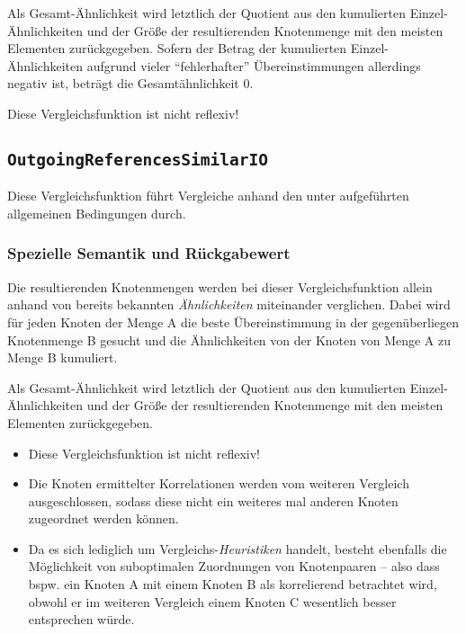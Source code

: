 Als Gesamt-Ähnlichkeit wird letztlich der Quotient aus den kumulierten Einzel-Ähnlichkeiten und der Größe der resultierenden Knotenmenge mit den meisten Elementen zurückgegeben. Sofern der Betrag der kumulierten Einzel-Ähnlichkeiten aufgrund vieler "`fehlerhafter"' Übereinstimmungen allerdings negativ ist, beträgt die Gesamtähnlichkeit $0$.

 Diese Vergleichsfunktion ist nicht reflexiv!

\newpage
%
%
\subsection{\texttt{OutgoingReferencesSimilarIO}}
Diese Vergleichsfunktion führt Vergleiche anhand den unter\mylinebreak{} aufgeführten allgemeinen Bedingungen durch.

\subsubsection*{Spezielle Semantik und Rückgabewert}
Die resultierenden Knotenmengen werden bei dieser Vergleichsfunktion allein anhand von bereits bekannten \emph{Ähnlichkeiten} miteinander verglichen. Dabei wird für jeden Knoten der Menge A die beste Übereinstimmung in der gegenüberliegen Knotenmenge B gesucht und die Ähnlichkeiten von der Knoten von Menge A zu Menge B kumuliert.

Als Gesamt-Ähnlichkeit wird letztlich der Quotient aus den kumulierten Einzel-Ähnlichkeiten und der Größe der resultierenden Knotenmenge mit den meisten Elementen zurückgegeben.

\begin{itemize}
	\item Diese Vergleichsfunktion ist nicht reflexiv!
	\item Die Knoten ermittelter Korrelationen werden vom weiteren Vergleich ausgeschlossen, sodass diese nicht ein weiteres mal anderen Knoten zugeordnet werden können.
	\item Da es sich lediglich um Vergleichs-\emph{Heuristiken} handelt, besteht ebenfalls die Möglichkeit von suboptimalen Zuordnungen von Knotenpaaren -- also dass bspw. ein Knoten A mit einem Knoten B als korrelierend betrachtet wird, obwohl er im weiteren Vergleich einem Knoten C wesentlich besser entsprechen würde.
\end{itemize}


%
%
